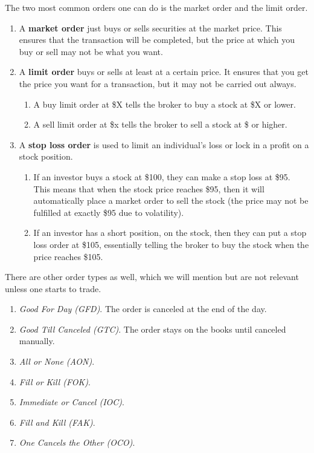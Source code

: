 \documentclass{article}
\begin{document}
    \begin{definition}
      The two most common orders one can do is the market order and the limit order. 
      \begin{enumerate}
        \item A \textbf{market order} just buys or sells securities at the market price. This ensures that the transaction will be completed, but the price at which you buy or sell may not be what you want. 
        \item A \textbf{limit order} buys or sells at least at a certain price. It ensures that you get the price you want for a transaction, but it may not be carried out always. 
        \begin{enumerate}
          \item A buy limit order at \$X tells the broker to buy a stock at \$X or lower. 
          \item A sell limit order at \$x tells the broker to sell a stock at \$ or higher. 
        \end{enumerate}
        \item A \textbf{stop loss order} is used to limit an individual's loss or lock in a profit on a stock position. 
        \begin{enumerate}
          \item If an investor buys a stock at \$100, they can make a stop loss at \$95. This means that when the stock price reaches \$95, then it will automatically place a market order to sell the stock (the price may not be fulfilled at exactly \$95 due to volatility). 
          \item If an investor has a short position, on the stock, then they can put a stop loss order at \$105, essentially telling the broker to buy the stock when the price reaches \$105. 
        \end{enumerate}
      \end{enumerate}
    \end{definition}

    There are other order types as well, which we will mention but are not relevant unless one starts to trade. 
    \begin{enumerate}
      \item \textit{Good For Day (GFD)}. The order is canceled at the end of the day. 
      \item \textit{Good Till Canceled (GTC)}. The order stays on the books until canceled manually. 
      \item \textit{All or None (AON)}. 
      \item \textit{Fill or Kill (FOK)}.
      \item \textit{Immediate or Cancel (IOC)}. 
      \item \textit{Fill and Kill (FAK)}. 
      \item \textit{One Cancels the Other (OCO)}. 
    \end{enumerate}
\end{document}
